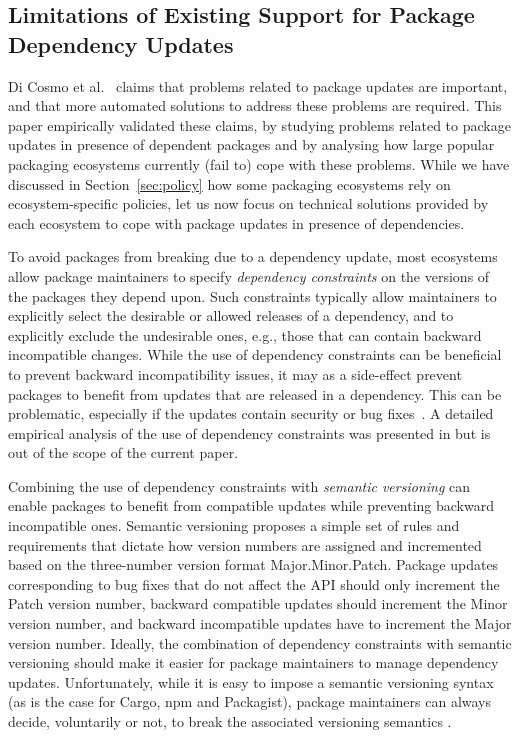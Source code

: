 \documentclass[smallextended]{svjour3}       %
\newcommand{\etal}{et al.\xspace}
\newcommand{\eg}{e.g.,\xspace}
\newcommand{\sect}[1]{Section~\ref{#1}}
\newcommand{\packagist}{\textsf{Packagist}\xspace}
\newcommand{\cargo}{\textsf{Cargo}\xspace}
\newcommand{\npm}{\textsf{npm}\xspace}
\begin{document}
\subsection{Limitations of Existing Support for Package Dependency Updates}
\label{sec:tool-limitations}

Di Cosmo \etal~\cite{DiCosmo2008} claims that problems related to package updates are important, and that more automated solutions to address these problems are required. This paper empirically validated these claims, by studying problems related to package updates in presence of dependent packages and by analysing how large popular packaging ecosystems currently (fail to) cope with these problems.
While we have discussed in \sect{sec:policy} how some packaging ecosystems rely on ecosystem-specific policies, let us now focus on  
technical solutions provided by each ecosystem to cope with package updates in presence of dependencies.

To avoid packages from breaking due to a dependency update, most ecosystems allow package maintainers to specify \emph{dependency constraints} on the versions of the packages they depend upon. Such constraints typically allow maintainers to explicitly select the desirable or allowed releases of a dependency, and to explicitly exclude the undesirable ones, \eg those that can contain backward incompatible changes.
While the use of dependency constraints can be beneficial to prevent backward incompatibility issues, it may as a side-effect prevent packages to benefit from updates that are released in a dependency.
This can be problematic, especially if the updates contain security or bug fixes~\cite{Cox2015}. 
A detailed empirical analysis of the use of dependency constraints was presented in \cite{Decan2017SANER} but is out of the scope of the current paper.


Combining the use of dependency constraints with \emph{semantic versioning} can enable packages to benefit from compatible updates while preventing backward incompatible ones.
Semantic versioning proposes a simple set of rules and requirements that dictate how version numbers are assigned and incremented based on the three-number version format \textsf{Major.Minor.Patch}. 
Package updates corresponding to bug fixes that do not affect the API should only increment the \textsf{Patch} version number, backward compatible updates should increment the \textsf{Minor} version number, and backward incompatible updates have to increment the \textsf{Major} version number.
Ideally, the combination of dependency constraints with semantic versioning should make it easier for package maintainers to manage dependency updates. 
Unfortunately, while it is easy to impose a semantic versioning syntax (as is the case for \cargo, \npm and \packagist), package maintainers can always decide, voluntarily or not, to break the associated versioning semantics \cite{Raemaekers2014}. 
\end{document}
